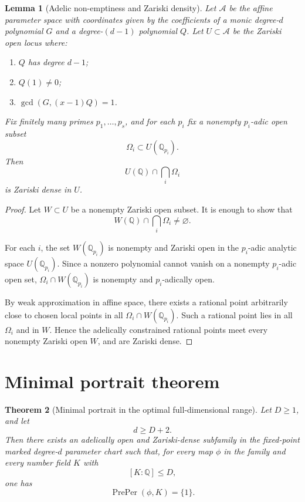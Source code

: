 \documentclass[11pt]{article}
\newtheorem{theorem}{Theorem}[section]
\newtheorem{lemma}[theorem]{Lemma}
\begin{document}
\begin{lemma}[Adelic non-emptiness and Zariski density]
Let \(\mathcal A\) be the affine parameter space with coordinates given by the coefficients of a monic degree-\(d\) polynomial \(G\) and a degree-\((d-1)\) polynomial \(Q\). Let \(U\subset\mathcal A\) be the Zariski open locus where:
\begin{enumerate}
\item \(Q\) has degree \(d-1\);
\item \(Q(1)\ne0\);
\item \(\gcd(G,(x-1)Q)=1\).
\end{enumerate}
Fix finitely many primes \(p_1,\ldots,p_s\), and for each \(p_i\) fix a nonempty \(p_i\)-adic open subset
\[
\Omega_i\subset U(\mathbb Q_{p_i}).
\]
Then
\[
U(\mathbb Q)\cap\bigcap_i\Omega_i
\]
is Zariski dense in \(U\).
\end{lemma}

\begin{proof}
Let \(W\subset U\) be a nonempty Zariski open subset. It is enough to show that
\[
W(\mathbb Q)\cap\bigcap_i\Omega_i\ne\varnothing.
\]

For each \(i\), the set \(W(\mathbb Q_{p_i})\) is nonempty and Zariski open in the \(p_i\)-adic analytic space \(U(\mathbb Q_{p_i})\). Since a nonzero polynomial cannot vanish on a nonempty \(p_i\)-adic open set, \(\Omega_i\cap W(\mathbb Q_{p_i})\) is nonempty and \(p_i\)-adically open.

By weak approximation in affine space, there exists a rational point arbitrarily close to chosen local points in all \(\Omega_i\cap W(\mathbb Q_{p_i})\). Such a rational point lies in all \(\Omega_i\) and in \(W\). Hence the adelically constrained rational points meet every nonempty Zariski open \(W\), and are Zariski dense.
\end{proof}

\section{Minimal portrait theorem}

\begin{theorem}[Minimal portrait in the optimal full-dimensional range]
Let \(D\ge1\), and let
\[
d\ge D+2.
\]
Then there exists an adelically open and Zariski-dense subfamily in the fixed-point marked degree-\(d\) parameter chart such that, for every map \(\phi\) in the family and every number field \(K\) with
\[
[K:\mathbb Q]\le D,
\]
one has
\[
\operatorname{PrePer}(\phi,K)=\{1\}.
\]
\end{theorem}
\end{document}
